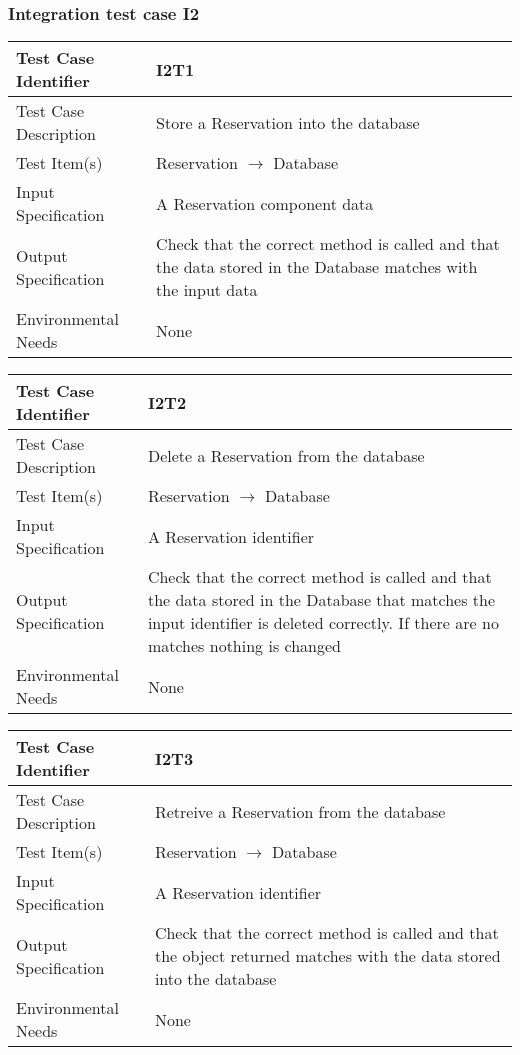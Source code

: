 		\subsubsection{Integration test case I2}
		\begin{center}
			\begin{tabular}{ |l p{10cm}| } \hline
				Test Case Identifier & I2T1 \\ \hline
				Test Case Description & Store a Reservation into the database \\ \hline
				Test Item(s) & Reservation $\rightarrow$ Database \\ \hline
				Input Specification & A Reservation component data \\ \hline
				Output Specification & Check that the correct method is called and that the data stored in the Database
				matches with the input data \\ \hline
				Environmental Needs & None \\ \hline
			\end{tabular}
			\vspace{1cm}
			\begin{tabular}{ |l p{10cm}| } \hline
				Test Case Identifier & I2T2 \\ \hline
				Test Case Description & Delete a Reservation from the database \\ \hline
				Test Item(s) & Reservation $\rightarrow$ Database \\ \hline
				Input Specification & A Reservation identifier \\ \hline
				Output Specification & Check that the correct method is called and that the data stored in the Database
				that matches the input identifier is deleted correctly. If there are no matches nothing is changed \\ \hline
				Environmental Needs & None \\ \hline
			\end{tabular}
			\vspace{1cm}
			\begin{tabular}{ |l p{10cm}| } \hline
		        Test Case Identifier & I2T3 \\ \hline
		        Test Case Description & Retreive a Reservation from the database \\ \hline
		      	Test Item(s) & Reservation $\rightarrow$ Database \\ \hline
		        Input Specification & A Reservation identifier \\ \hline
		        Output Specification & Check that the correct method is called and that the object returned
		        matches with the data stored into the database\\ \hline
		        Environmental Needs & None \\ \hline
		    \end{tabular}
		\end{center}
